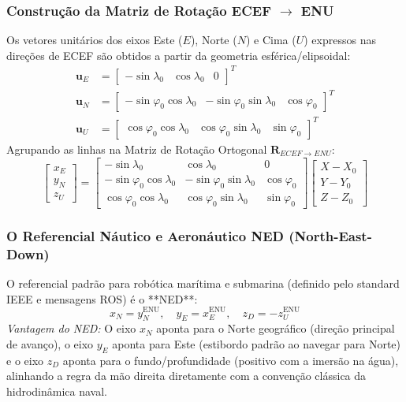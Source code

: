 \documentclass[11pt,a4paper]{article}
\begin{document}
\subsubsection{Construção da Matriz de Rotação ECEF $\to$ ENU}
Os vetores unitários dos eixos Este ($E$), Norte ($N$) e Cima ($U$) expressos nas direções de ECEF são obtidos a partir da geometria esférica/elipsoidal:
\begin{align}
    \mathbf{u}_E &= \begin{bmatrix} -\sin\lambda_0 & \cos\lambda_0 & 0 \end{bmatrix}^T \\
    \mathbf{u}_N &= \begin{bmatrix} -\sin\varphi_0 \cos\lambda_0 & -\sin\varphi_0 \sin\lambda_0 & \cos\varphi_0 \end{bmatrix}^T \\
    \mathbf{u}_U &= \begin{bmatrix} \cos\varphi_0 \cos\lambda_0 & \cos\varphi_0 \sin\lambda_0 & \sin\varphi_0 \end{bmatrix}^T
\end{align}
Agrupando as linhas na Matriz de Rotação Ortogonal $\mathbf{R}_{ECEF \to ENU}$:
\begin{equation}
    \label{eq:ecef_to_enu}
    \begin{bmatrix} x_E \\ y_N \\ z_U \end{bmatrix} =
    \begin{bmatrix}
        -\sin\lambda_0 & \cos\lambda_0 & 0 \\
        -\sin\varphi_0 \cos\lambda_0 & -\sin\varphi_0 \sin\lambda_0 & \cos\varphi_0 \\
        \cos\varphi_0 \cos\lambda_0 & \cos\varphi_0 \sin\lambda_0 & \sin\varphi_0
    \end{bmatrix}
    \begin{bmatrix} X - X_0 \\ Y - Y_0 \\ Z - Z_0 \end{bmatrix}
\end{equation}

\subsubsection{O Referencial Náutico e Aeronáutico NED (North-East-Down)}
O referencial padrão para robótica marítima e submarina (definido pelo standard IEEE e mensagens ROS) é o **NED**:
\begin{equation}
    x_N = y_N^{\text{ENU}}, \quad y_E = x_E^{\text{ENU}}, \quad z_D = -z_U^{\text{ENU}}
\end{equation}
\textit{Vantagem do NED:} O eixo $x_N$ aponta para o Norte geográfico (direção principal de avanço), o eixo $y_E$ aponta para Este (estibordo padrão ao navegar para Norte) e o eixo $z_D$ aponta para o fundo/profundidade (positivo com a imersão na água), alinhando a regra da mão direita diretamente com a convenção clássica da hidrodinâmica naval.
\end{document}
